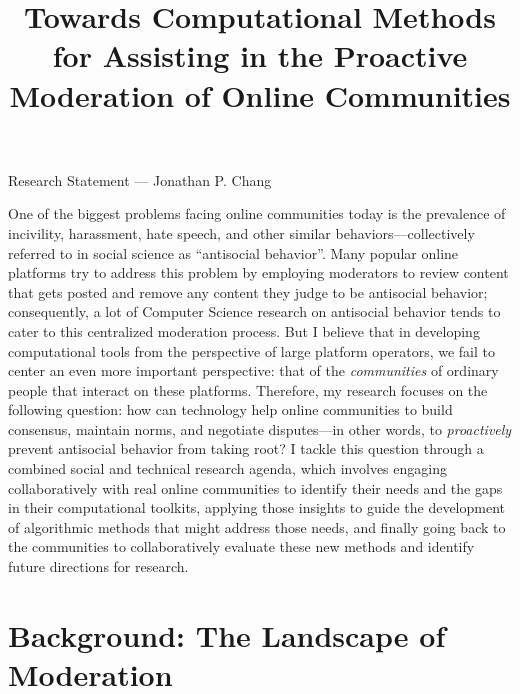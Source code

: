 \documentclass[11pt,letterpaper]{article}
\title{Towards Computational Methods for Assisting in the Proactive Moderation of Online Communities}
\begin{document}
\maketitle

\begin{center}
Research Statement --- Jonathan P. Chang
\end{center}

One of the biggest problems facing online communities today is the prevalence of incivility, harassment, hate speech, and other similar behaviors---collectively referred to in social science as ``antisocial behavior''.
Many popular online platforms try to address this problem by employing moderators to review content that gets posted and remove any content they judge to be antisocial behavior; consequently, a lot of Computer Science research on antisocial behavior tends to cater to this centralized moderation process.
But I believe that in developing computational tools from the perspective of large platform operators, we fail to center an even more important perspective: that of the \emph{communities} of ordinary people that interact on these platforms.
Therefore, my research focuses on the following question: how can technology help online communities to build consensus, maintain norms, and negotiate disputes---in other words, to \emph{proactively} prevent antisocial behavior from taking root?
I tackle this question through a combined social and technical research agenda, which involves engaging collaboratively with real online communities to identify their needs and the gaps in their computational toolkits, applying those insights to guide the development of algorithmic methods that might address those needs, and finally going back to the communities to collaboratively evaluate these new methods and identify future directions for research.

\section{Background: The Landscape of Moderation}
\end{document}
